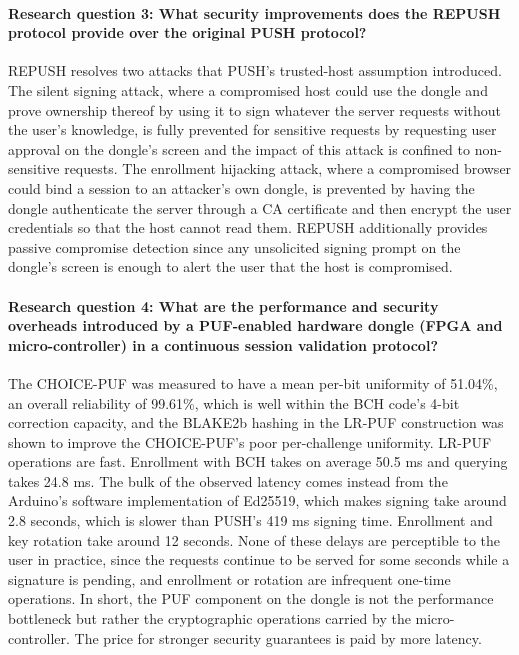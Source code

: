 \paragraph{Research question 3: What security improvements does the REPUSH protocol provide over the original PUSH protocol?} REPUSH resolves two attacks that PUSH's trusted-host assumption introduced. The silent signing attack, where a compromised host could use the dongle and prove ownership thereof by using it to sign whatever the server requests without the user's knowledge, is fully prevented for sensitive requests by requesting user approval on the dongle's screen and the impact of this attack is confined to non-sensitive requests. The enrollment hijacking attack, where a compromised browser could bind a session to an attacker's own dongle, is prevented by having the dongle authenticate the server through a CA certificate and then encrypt the user credentials so that the host cannot read them. REPUSH additionally provides passive compromise detection since any unsolicited signing prompt on the dongle's screen is enough to alert the user that the host is compromised. 

\paragraph{Research question 4: What are the performance and security overheads introduced by a PUF-enabled hardware dongle (FPGA and micro-controller) in a continuous session validation protocol?} The CHOICE-PUF was measured to have a mean per-bit uniformity of 51.04\%, an overall reliability of 99.61\%, which is well within the BCH code's 4-bit correction capacity, and the BLAKE2b hashing in the LR-PUF construction was shown to improve the CHOICE-PUF's poor per-challenge uniformity. LR-PUF operations are fast. Enrollment with BCH takes on average 50.5 ms and querying takes 24.8 ms. The bulk of the observed latency comes instead from the Arduino's software implementation of Ed25519, which makes signing take around 2.8 seconds, which is slower than PUSH's 419 ms signing time. Enrollment and key rotation take around 12 seconds. None of these delays are perceptible to the user in practice, since the requests continue to be served for some seconds while a signature is pending, and enrollment or rotation are infrequent one-time operations. In short, the PUF component on the dongle is not the performance bottleneck but rather the cryptographic operations carried by the micro-controller. The price for stronger security guarantees is paid by more latency.

